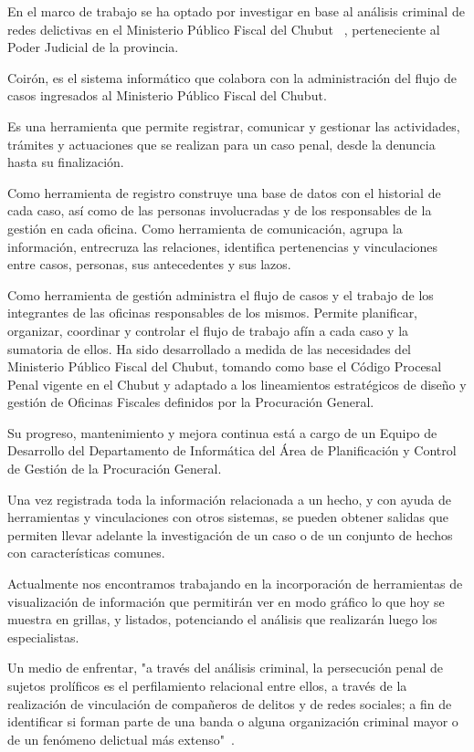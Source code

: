 En el marco de trabajo se ha optado por investigar en base al análisis criminal de redes delictivas en el Ministerio Público Fiscal del Chubut ~\cite{ref_article30}, perteneciente al Poder Judicial de la provincia.

Coirón, es el sistema informático que colabora con la administración del flujo de casos ingresados al Ministerio Público Fiscal del Chubut.

Es una herramienta que permite registrar, comunicar y gestionar las actividades, trámites y actuaciones que se realizan para un caso penal, desde la denuncia hasta su finalización.

Como herramienta de registro construye una base de datos con el historial de cada caso, así como de las personas involucradas y de los responsables de la gestión en cada oficina.
Como herramienta de comunicación, agrupa la información, entrecruza las relaciones, identifica pertenencias y vinculaciones entre casos, personas, sus antecedentes y sus lazos.

Como herramienta de gestión administra el flujo de casos y el trabajo de los integrantes de las oficinas responsables de los mismos. Permite planificar, organizar, coordinar y controlar el flujo de trabajo afín a cada caso y la sumatoria de ellos.
Ha sido desarrollado a medida de las necesidades del Ministerio Público Fiscal del Chubut, tomando como base el Código Procesal Penal vigente en el Chubut y adaptado a los lineamientos estratégicos de diseño y gestión de Oficinas Fiscales definidos por la Procuración General.

Su progreso, mantenimiento y mejora continua está a cargo de un Equipo de Desarrollo del Departamento de Informática del Área de Planificación y Control de Gestión de la Procuración General.

Una vez registrada toda la información relacionada a un hecho, y con ayuda de herramientas y vinculaciones con otros sistemas, se pueden obtener salidas que permiten llevar adelante la investigación de un caso o de un conjunto de hechos con características comunes.

Actualmente nos encontramos trabajando en la incorporación de herramientas de visualización de información que permitirán ver en modo gráfico lo que hoy se muestra en grillas, y listados, potenciando el análisis que realizarán luego los especialistas.

Un medio de enfrentar, "a través del análisis criminal, la persecución penal de sujetos prolíficos es el perfilamiento relacional entre ellos, a través de la realización de vinculación de compañeros de delitos y de redes sociales; a fin de identificar si forman parte de una banda o alguna organización criminal mayor o de un fenómeno delictual más extenso"~\cite{ref_article31}.


